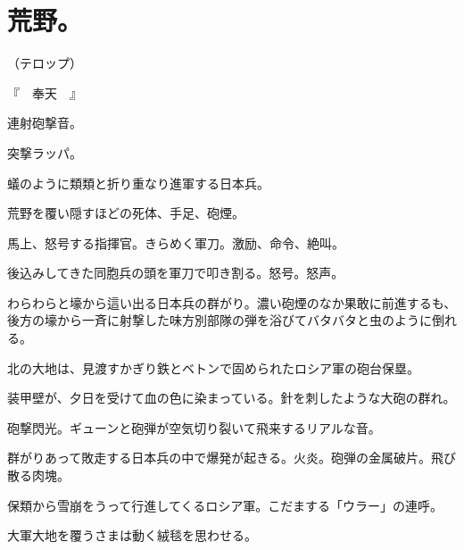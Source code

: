 \section*{荒野。}

（テロップ）

『　奉天　』

連射砲撃音。

突撃ラッパ。

蟻のように類類と折り重なり進軍する日本兵。

荒野を覆い隠すほどの死体、手足、砲煙。

馬上、怒号する指揮官。きらめく軍刀。激励、命令、絶叫。

後込みしてきた同胞兵の頭を軍刀で叩き割る。怒号。怒声。

わらわらと壕から這い出る日本兵の群がり。濃い砲煙のなか果敢に前進するも、後方の壕から一斉に射撃した味方別部隊の弾を浴びてバタバタと虫のように倒れる。

北の大地は、見渡すかぎり鉄とベトンで固められたロシア軍の砲台保塁。

装甲壁が、夕日を受けて血の色に染まっている。針を刺したような大砲の群れ。

砲撃閃光。ギューンと砲弾が空気切り裂いて飛来するリアルな音。

群がりあって敗走する日本兵の中で爆発が起きる。火炎。砲弾の金属破片。飛び散る肉塊。

保類から雪崩をうって行進してくるロシア軍。こだまする「ウラー」の連呼。

大軍大地を覆うさまは動く絨毯を思わせる。
